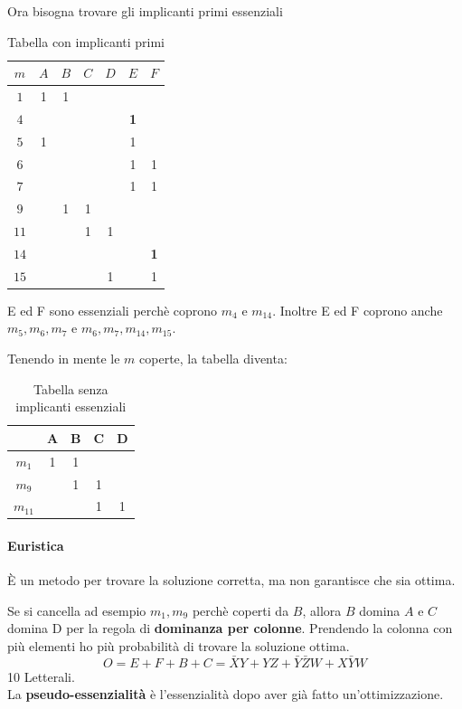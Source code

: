 \documentclass[a4paper]{article}
\theoremstyle{break}
\theoremstyle{break}
\theoremstyle{break}
\theoremstyle{break}
\begin{document}
\begin{example}
Ora bisogna trovare gli implicanti primi essenziali
\begin{table}[H]
    \begin{center}
        \begin{tabular}{c|c|c|c|c|c|c}
            \( m \) & \( A \) & \( B \) & \( C \) & \( D \) & \( E \) & \( F \)\\ 
            \hline
            \( 1 \) & 1 & 1 &  &  &  &   \\
            \( 4 \) &  &  &  &  & \textbf{1} &   \\
            \( 5 \) & 1 &  &  &  & 1 &   \\
            \( 6 \) &  &  &  &  & 1 & 1  \\
            \( 7 \) &  &  &  &  & 1 & 1  \\
            \( 9 \) &  & 1 & 1 &  &  &   \\
            \( 11 \) &  &  & 1 & 1 &  &  \\
            \( 14 \) &  &  &  &  &  & \textbf{1}  \\
            \( 15 \) &  &  &  & 1 &  & 1  \\
        \end{tabular}
    \end{center}
    \caption{Tabella con implicanti primi}
\end{table}
E ed F sono essenziali perchè coprono \( m_4 \) e \( m_{14} \). Inoltre E ed F coprono
anche \( m_5, m_6, m_7 \) e \( m_6, m_7, m_{14}, m_{15} \).  

Tenendo in mente le \( m \) coperte, la tabella diventa:
\begin{table}[H]
    \begin{center}
        \begin{tabular}{c|c|c|c|c}
        & A & B & C & D\\
        \hline
            \( m_1 \) & 1 & 1 &  &  \\ 
            \( m_9 \) &  & 1 & 1 &  \\
            \( m_{11} \) &  &  & 1 & 1 \\ 
        \end{tabular}
    \end{center}
    \caption{Tabella senza implicanti essenziali}
\end{table}
\paragraph{Euristica} È un metodo per trovare la soluzione corretta, ma non garantisce
che sia ottima.

Se si cancella ad esempio \( m_1, m_9 \) perchè coperti da \( B \), allora \( B \)
domina \( A \) e \( C \) domina D per la regola di \textbf{dominanza per colonne}.
Prendendo la colonna con più elementi ho più probabilità di trovare la soluzione
ottima.
\[
    O=E+F+B+C = \bar{X}Y+YZ+\bar{Y}\bar{Z}W+X\bar{Y}W
\] 
10 Letterali.\\
La \textbf{pseudo-essenzialità} è l'essenzialità dopo aver già fatto un'ottimizzazione.
\end{example}
\end{document}

